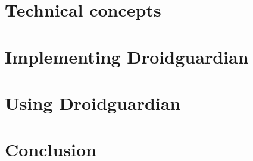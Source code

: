 \documentclass[a4paper,12pt,twoside]{book}
\begin{document}
\chapter{Technical concepts}
\label{chap:technical_concepts}


\chapter{Implementing Droidguardian}
\label{chap:implementing_dg}


\chapter{Using Droidguardian}
\label{chap:using_dg}


\chapter{Conclusion}
\label{chap:conclusion}


\renewcommand{\bibname}{References}



% 
    
\end{document}
